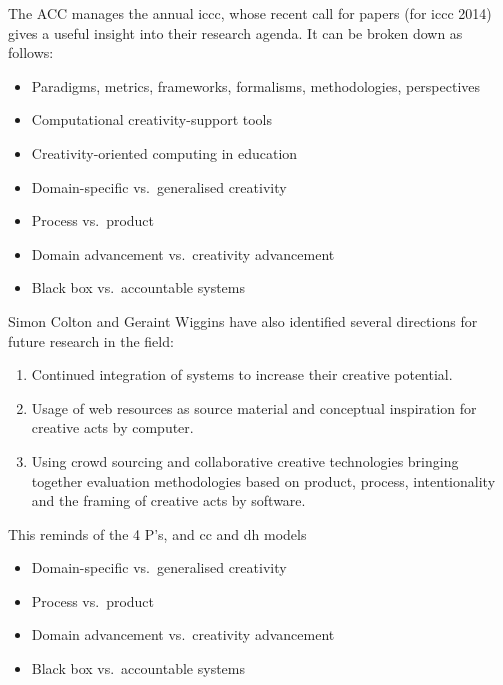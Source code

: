 The ACC manages the annual \gls{iccc}, whose recent call for papers  (for \gls{iccc} 2014) gives a useful insight into their research agenda. It can be broken down as follows:

\begin{itemize}
  \item Paradigms, metrics, frameworks, formalisms, methodologies, perspectives
  \item Computational creativity-support tools
  \item Creativity-oriented computing in education
  \item Domain-specific vs.\ generalised creativity
  \item Process vs.\ product
  \item Domain advancement vs.\ creativity advancement
  \item Black box vs.\ accountable systems
\end{itemize}

Simon Colton and Geraint Wiggins have also identified several directions for future research in the field: \autocite[p.5]{Colton2012}

\begin{enumerate}
  \item Continued integration of systems to increase their creative potential.
  \item Usage of web resources as source material and conceptual inspiration for creative acts by computer.
  \item Using crowd sourcing and collaborative creative technologies bringing together evaluation methodologies based on product, process, intentionality and the framing of creative acts by software.
\end{enumerate}

\begin{draft}
  This reminds of the 4 P’s, and \gls{cc} and \gls{dh} models
\end{draft}

\begin{shaded}
  \begin{itemize}
  \item Domain-specific vs.\ generalised creativity
  \item Process vs.\ product
  \item Domain advancement vs.\ creativity advancement
  \item Black box vs.\ accountable systems
  \end{itemize}
\end{shaded}


